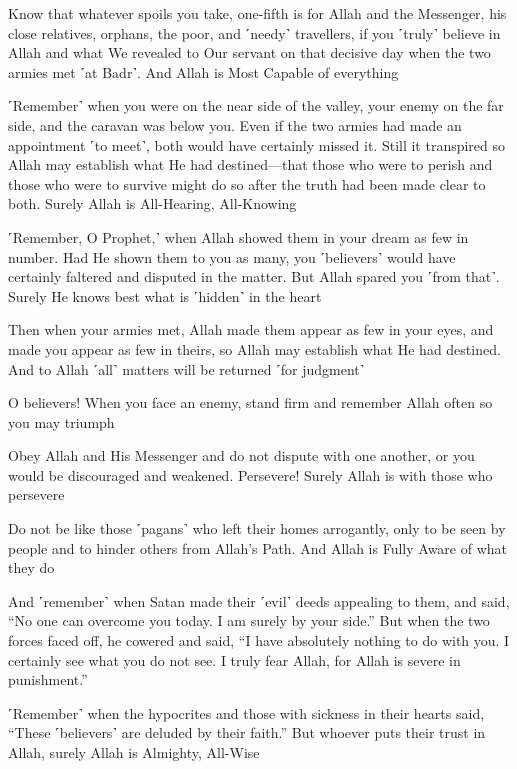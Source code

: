 Know that whatever spoils you take, one-fifth is for Allah and the Messenger, his close relatives, orphans, the poor, and ˹needy˺ travellers, if you ˹truly˺ believe in Allah and what We revealed to Our servant on that decisive day when the two armies met ˹at Badr˺. And Allah is Most Capable of everything

˹Remember˺ when you were on the near side of the valley, your enemy on the far side, and the caravan was below you. Even if the two armies had made an appointment ˹to meet˺, both would have certainly missed it. Still it transpired so Allah may establish what He had destined—that those who were to perish and those who were to survive might do so after the truth had been made clear to both. Surely Allah is All-Hearing, All-Knowing

˹Remember, O Prophet,˺ when Allah showed them in your dream as few in number. Had He shown them to you as many, you ˹believers˺ would have certainly faltered and disputed in the matter. But Allah spared you ˹from that˺. Surely He knows best what is ˹hidden˺ in the heart

Then when your armies met, Allah made them appear as few in your eyes, and made you appear as few in theirs, so Allah may establish what He had destined. And to Allah ˹all˺ matters will be returned ˹for judgment˺

O believers! When you face an enemy, stand firm and remember Allah often so you may triumph

Obey Allah and His Messenger and do not dispute with one another, or you would be discouraged and weakened. Persevere! Surely Allah is with those who persevere

Do not be like those ˹pagans˺ who left their homes arrogantly, only to be seen by people and to hinder others from Allah’s Path. And Allah is Fully Aware of what they do

And ˹remember˺ when Satan made their ˹evil˺ deeds appealing to them, and said, “No one can overcome you today. I am surely by your side.” But when the two forces faced off, he cowered and said, “I have absolutely nothing to do with you. I certainly see what you do not see. I truly fear Allah, for Allah is severe in punishment.”

˹Remember˺ when the hypocrites and those with sickness in their hearts said, “These ˹believers˺ are deluded by their faith.” But whoever puts their trust in Allah, surely Allah is Almighty, All-Wise

